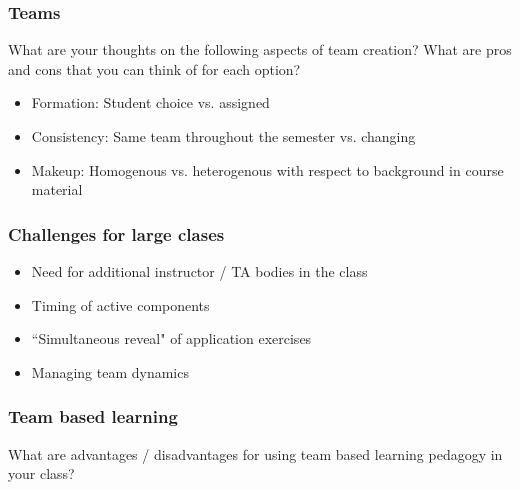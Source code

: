\documentclass{beamer}
\begin{document}
\begin{frame}
\frametitle{Teams}

\alert{What are your thoughts on the following aspects of team creation? What are pros and cons that you can think of for each option?}

\begin{itemize}

\item Formation: Student choice vs. assigned

\item Consistency: Same team throughout the semester vs. changing

\item Makeup: Homogenous vs. heterogenous with respect to background in course material

\end{itemize}

\end{frame}


\begin{frame}
\frametitle{Challenges for large clases}

\begin{itemize}

\item Need for additional instructor / TA bodies in the class

\pause

\item Timing of active components

\pause

\item ``Simultaneous reveal" of application exercises

\pause

\item Managing team dynamics

\end{itemize}

\end{frame}



\begin{frame}
\frametitle{Team based learning}

\vfill

\alert{
What are advantages / disadvantages for using team based learning pedagogy in your class?
}

\vfill

\end{frame}
\end{document}
